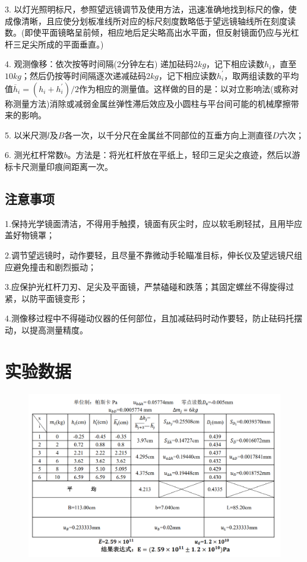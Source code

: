 \documentclass{article}
\begin{document}
3. 以灯光照明标尺，参照望远镜调节及使用方法，迅速准确地找到标尺的像，使成像清晰，且应使分划板准线所对应的标尺刻度数略低于望远镜轴线所在刻度读数。(即使平面镜略呈前倾，相应地后足尖略高出水平面，但反射镜面仍应与光杠杆三足尖所成的平面垂直。) 

4. 观测像移：依次按等时间隔(2分钟左右) 递加砝码\(2kg\)，记下相应读数\(h_{i}\)，直至\(10kg\)；然后仍按等时间隔逐次递减砝码\(2kg\)，记下相应读数\(h_{i}^{'}\)，取两组读数的平均值\(\overline{h}_{i}=(h_{i}+h_{i}^{'})/2\)作为相应的测量值。这样做的目的是：以对立影响法(或称对称测量方法)消除或减弱金属丝弹性滞后效应及小圆柱与平台间可能的机械摩擦带来的影响。 

5. 以米尺测\(l\)及\(B\)各一次，以千分尺在金属丝不同部位的互垂方向上测直径\(D\)六次； 

6. 测光杠杆常数\(b\)。方法是：将光杠杆放在平纸上，轻印三足尖之痕迹，然后以游标卡尺测量印痕间距离一次。

\subsection{注意事项}
1.保持光学镜面清洁，不得用手触摸，镜面有灰尘时，应以软毛刷轻拭，且用毕应盖好物镜罩；

2.调节望远镜时，动作要轻，且尽量不靠微动手轮瞄准目标，伸长仪及望远镜尺组应避免撞击和剧烈振动；

3.应保护光杠杆刀刃、足尖及平面镜，严禁磕碰和跌落；其固定螺丝不得旋得过紧，以防平面镜变形；

4.测像移过程中不得碰动仪器的任何部位，且加减砝码时动作要轻，防止砝码托摆动，以提高测量精度。

\section{实验数据}
\begin{figure}[!ht]
    \centering
    \includegraphics[width=16cm]{data.png}
\end{figure}
\end{document}

